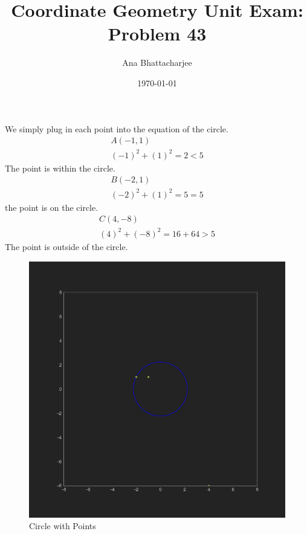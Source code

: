 \documentclass{article}
\begin{document}
\title{Coordinate Geometry Unit Exam: Problem 43}
\author{Ana Bhattacharjee}
\date{\today}
\maketitle{}

\begin{center}
We simply plug in each point into the equation of the circle.
\begin{align}
  A (-1, 1) \\
  (-1)^2 + (1)^2 = 2 < 5
\end{align}
The point is within the circle.
\begin{align}
  B (-2, 1) \\
  (-2)^2 + (1)^2 = 5 = 5
\end{align}
the point is on the circle.
\begin{align}
  C (4, -8) \\
  (4)^2 + (-8)^2 = 16 + 64 > 5
\end{align}
The point is outside of the circle.
\par
\begin{figure}[!htbp]
  \includegraphics[width=1.0\columnwidth]{circle}
  \caption{Circle with Points}
\end{figure}
\end{center}
\end{document}

